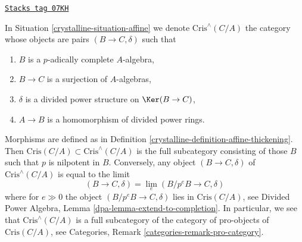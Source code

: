 \begin{remark}
\label{crystalline-remark-completed-affine-site}
\href{https://stacks.math.columbia.edu/tag/07KH}{\texttt{Stacks tag 07KH}}

In Situation \ref{crystalline-situation-affine} we denote
$\text{Cris}^\wedge(C/A)$ the category whose objects are
pairs $(B \to C, \delta)$ such that
\begin{enumerate}
\item $B$ is a $p$-adically complete $A$-algebra,
\item $B \to C$ is a surjection of $A$-algebras,
\item $\delta$ is a divided power structure on $\Ker(B \to C)$,
\item $A \to B$ is a homomorphism of divided power rings.
\end{enumerate}
Morphisms are defined as in Definition \ref{crystalline-definition-affine-thickening}.
Then $\text{Cris}(C/A) \subset \text{Cris}^\wedge(C/A)$ is the full
subcategory consisting of those $B$ such that $p$ is nilpotent in $B$.
Conversely, any object $(B \to C, \delta)$ of $\text{Cris}^\wedge(C/A)$
is equal to the limit
$$
(B \to C, \delta) = \lim_e (B/p^eB \to C, \delta)
$$
where for $e \gg 0$ the object $(B/p^eB \to C, \delta)$ lies
in $\text{Cris}(C/A)$, see
Divided Power Algebra, Lemma \ref{dpa-lemma-extend-to-completion}.
In particular, we see that $\text{Cris}^\wedge(C/A)$ is a full subcategory
of the category of pro-objects of $\text{Cris}(C/A)$, see
Categories, Remark \ref{categories-remark-pro-category}.
\end{remark}

